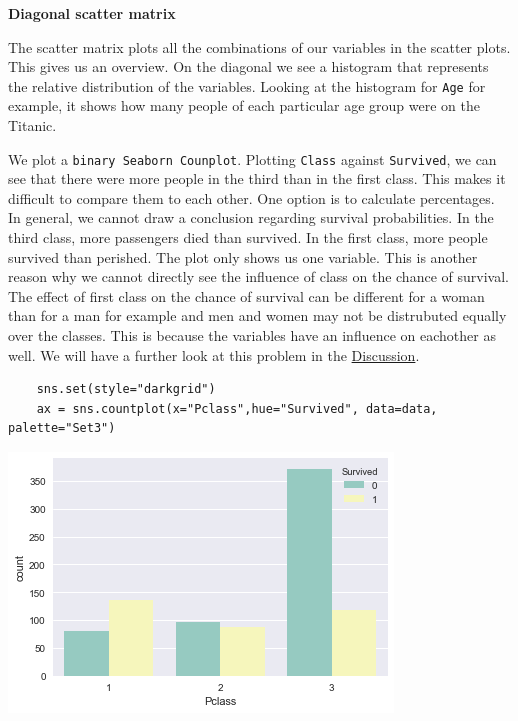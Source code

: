 \documentclass[11pt]{article}
\begin{document}
\textbf{Diagonal scatter matrix} 

The scatter matrix plots all the combinations of our variables in the scatter plots. This gives us an overview. On the diagonal we see a histogram that represents the relative distribution of the variables. Looking at the histogram for \texttt{Age} for example, it shows how many people of each particular age group were on the Titanic. 


We plot a \texttt{binary Seaborn Counplot}. Plotting \texttt{Class} against \texttt{Survived}, we can see that there were more people in the third than in the first class. This makes it difficult to compare them to each other. One option is to calculate percentages. In general, we cannot draw a conclusion regarding survival probabilities. In the third class, more passengers died than survived. In the first class, more people survived than perished. The plot only shows us one variable. This is another reason why we cannot directly see the influence of class on the chance of survival. The effect of first class on the chance of survival can be different for a woman than for a man for example and men and women may not be distrubuted equally over the classes. This is because the variables have an influence on eachother as well. We will have a further look at this problem in the \hyperref[sec:discussion]{Discussion}.

\begin{verbatim}
    sns.set(style="darkgrid")
    ax = sns.countplot(x="Pclass",hue="Survived", data=data, palette="Set3")
\end{verbatim}

\begin{center}
\includegraphics[width=.9\linewidth]{obipy-resources/b207b8ecf66cdede2d5455fb7467ce47-17581z4s.png}
\end{center}
\end{document}
